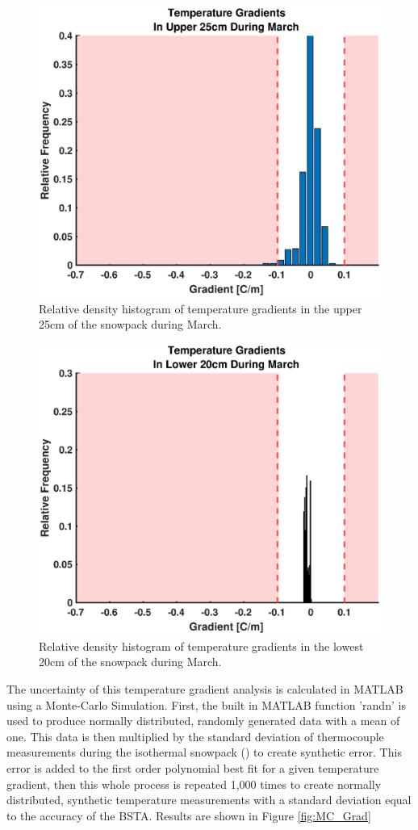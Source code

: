    \begin{figure}[H]
    \centering
    \includegraphics[width=0.7\linewidth]{figures/TempGrad/Mar_U25_RDH.eps}
    \caption{Relative density histogram of temperature gradients in the upper 25cm of the snowpack during March.}
    \label{fig:Mar_U25_RDH}
 \end{figure}
 
   \begin{figure}[H]
    \centering
    \includegraphics[width=0.7\linewidth]{figures/TempGrad/Mar_L20_RDH.eps}
    \caption{Relative density histogram of temperature gradients in the lowest 20cm of the snowpack during March.}
    \label{fig:Mar_L20_RDH}
 \end{figure}
 
The uncertainty of this temperature gradient analysis is calculated in MATLAB using a Monte-Carlo Simulation. First, the built in MATLAB function 'randn' is used to produce normally distributed, randomly generated data with a mean of one. This data is then multiplied by the standard deviation of thermocouple measurements during the isothermal snowpack (\isostd) to create synthetic error. This error is added to the first order polynomial best fit for a given temperature gradient, then this whole process is repeated 1,000 times to create normally distributed, synthetic temperature measurements with a standard deviation equal to the accuracy of the BSTA. Results are shown in Figure \ref{fig:MC_Grad}


